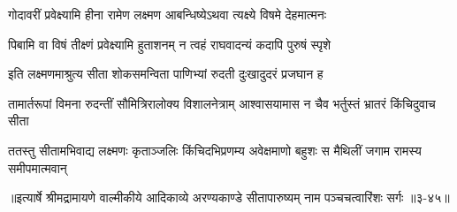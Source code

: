 \twolineshloka
{गोदावरीं प्रवेक्ष्यामि हीना रामेण लक्ष्मण}
{आबन्धिष्येऽथवा त्यक्ष्ये विषमे देहमात्मनः} %

\twolineshloka
{पिबामि वा विषं तीक्ष्णं प्रवेक्ष्यामि हुताशनम्}
{न त्वहं राघवादन्यं कदापि पुरुषं स्पृशे} %

\twolineshloka
{इति लक्ष्मणमाश्रुत्य सीता शोकसमन्विता}
{पाणिभ्यां रुदती दुःखादुदरं प्रजघान ह} %

\twolineshloka
{तामार्तरूपां विमना रुदन्तीं सौमित्रिरालोक्य विशालनेत्राम्}
{आश्वासयामास न चैव भर्तुस्तं भ्रातरं किंचिदुवाच सीता} %

\twolineshloka
{ततस्तु सीतामभिवाद्य लक्ष्मणः कृताञ्जलिः किंचिदभिप्रणम्य}
{अवेक्षमाणो बहुशः स मैथिलीं जगाम रामस्य समीपमात्मवान्} %


॥इत्यार्षे श्रीमद्रामायणे वाल्मीकीये आदिकाव्ये अरण्यकाण्डे सीतापारुष्यम् नाम पञ्चचत्वारिंशः सर्गः ॥३-४५॥
